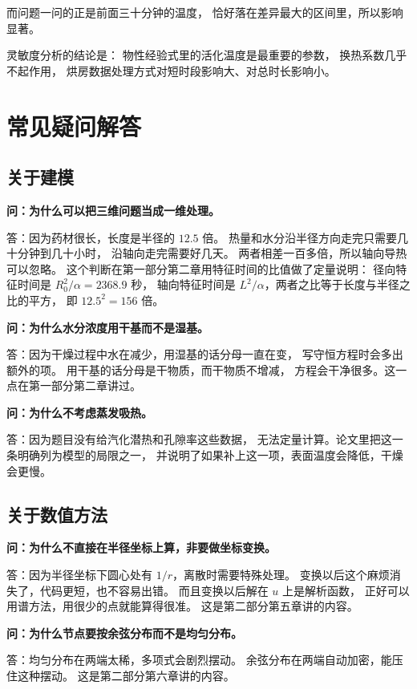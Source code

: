而问题一问的正是前面三十分钟的温度，
恰好落在差异最大的区间里，所以影响显著。

\keypoint
灵敏度分析的结论是：
物性经验式里的活化温度是最重要的参数，
换热系数几乎不起作用，
烘房数据处理方式对短时段影响大、对总时长影响小。

\section{常见疑问解答}

\subsection{关于建模}

\textbf{问：为什么可以把三维问题当成一维处理。}

答：因为药材很长，长度是半径的 $12.5$ 倍。
热量和水分沿半径方向走完只需要几十分钟到几十小时，
沿轴向走完需要好几天。
两者相差一百多倍，所以轴向导热可以忽略。
这个判断在第一部分第二章用特征时间的比值做了定量说明：
径向特征时间是 $R_0^2/\alpha=2368.9$ 秒，
轴向特征时间是 $L^2/\alpha$，两者之比等于长度与半径之比的平方，
即 $12.5^2=156$ 倍。

\textbf{问：为什么水分浓度用干基而不是湿基。}

答：因为干燥过程中水在减少，用湿基的话分母一直在变，
写守恒方程时会多出额外的项。
用干基的话分母是干物质，而干物质不增减，
方程会干净很多。这一点在第一部分第二章讲过。

\textbf{问：为什么不考虑蒸发吸热。}

答：因为题目没有给汽化潜热和孔隙率这些数据，
无法定量计算。论文里把这一条明确列为模型的局限之一，
并说明了如果补上这一项，表面温度会降低，干燥会更慢。

\subsection{关于数值方法}

\textbf{问：为什么不直接在半径坐标上算，非要做坐标变换。}

答：因为半径坐标下圆心处有 $1/r$，离散时需要特殊处理。
变换以后这个麻烦消失了，代码更短，也不容易出错。
而且变换以后解在 $u$ 上是解析函数，
正好可以用谱方法，用很少的点就能算得很准。
这是第二部分第五章讲的内容。

\textbf{问：为什么节点要按余弦分布而不是均匀分布。}

答：均匀分布在两端太稀，多项式会剧烈摆动。
余弦分布在两端自动加密，能压住这种摆动。
这是第二部分第六章讲的内容。

